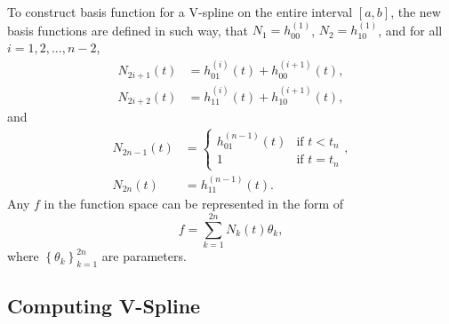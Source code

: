 To construct basis function for a V-spline on the entire interval $[a,b]$, the new basis functions are defined in such way, that $N_1 = h^{(1)}_{00}$, $N_2 = h^{(1)}_{10}$, and for all $i=1,2,\ldots,n-2$, 
\begin{align*}
N_{2i+1}(t)&=h_{01}^{(i)}(t)+h_{00}^{(i+1)}(t), \\
N_{2i+2}(t)&= h_{11}^{(i)}(t)+h_{10}^{(i+1)}(t),
\end{align*}
and
\begin{align*}
N_{2n-1}(t) &= 
\begin{cases}
h_{01}^{(n-1)}(t) & \mbox{if $t<t_n$}\\ 
1 & \mbox{if $t=t_n$}
\end{cases},\\
N_{2n}(t) &= h_{11}^{(n-1)}(t).
\end{align*}
Any $f$ in the function space can be represented in the form of
\begin{equation}
f=\sum_{k=1}^{2n}N_k(t)\theta_k,
\end{equation}
where $\left\lbrace \theta_k\right\rbrace_{k=1}^{2n}$ are parameters.





\subsection{Computing V-Spline}

